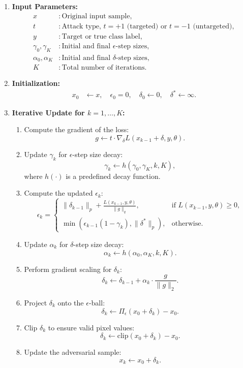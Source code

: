 \begin{enumerate}
    \item \textbf{Input Parameters:}  
    \begin{align*}
    x &: \text{Original input sample}, \\
    t &: \text{Attack type, } t = +1 \text{ (targeted) or } t = -1 \text{ (untargeted)}, \\
    y &: \text{Target or true class label}, \\
    \gamma_0, \gamma_K &: \text{Initial and final $\epsilon$-step sizes}, \\
    \alpha_0, \alpha_K &: \text{Initial and final $\delta$-step sizes}, \\
    K &: \text{Total number of iterations}.
    \end{align*}

    \item \textbf{Initialization:}  
    \begin{align*}
    x_0 &\leftarrow x, \quad \epsilon_0 = 0, \quad \delta_0 \leftarrow 0, \quad \delta^* \leftarrow \infty.
    \end{align*}

    \item \textbf{Iterative Update for $k = 1, \ldots, K$:}  
    \begin{enumerate}
        \item Compute the gradient of the loss:
        \[
        g \leftarrow t \cdot \nabla_{\delta} L(x_{k-1} + \delta, y, \theta).
        \]
        \item Update $\gamma_k$ for $\epsilon$-step size decay:
        \[
        \gamma_k \leftarrow h(\gamma_0, \gamma_K, k, K),
        \]
        where $h(\cdot)$ is a predefined decay function.
        \item Compute the updated $\epsilon_k$:
        \[
        \epsilon_k = 
        \begin{cases} 
        \|\delta_{k-1}\|_p + \frac{L(x_{k-1}, y, \theta)}{\|g\|_q}, & \text{if } L(x_{k-1}, y, \theta) \geq 0, \\
        \min(\epsilon_{k-1}(1 - \gamma_k), \|\delta^*\|_p), & \text{otherwise.}
        \end{cases}
        \]
        \item Update $\alpha_k$ for $\delta$-step size decay:
        \[
        \alpha_k \leftarrow h(\alpha_0, \alpha_K, k, K).
        \]
        \item Perform gradient scaling for $\delta_k$:
        \[
        \delta_k \leftarrow \delta_{k-1} + \alpha_k \cdot \frac{g}{\|g\|_2}.
        \]
        \item Project $\delta_k$ onto the $\epsilon$-ball:
        \[
        \delta_k \leftarrow \Pi_\epsilon(x_0 + \delta_k) - x_0.
        \]
        \item Clip $\delta_k$ to ensure valid pixel values:
        \[
        \delta_k \leftarrow \text{clip}(x_0 + \delta_k) - x_0.
        \]
        \item Update the adversarial sample:
        \[
        x_k \leftarrow x_0 + \delta_k.
        \]
    \end{enumerate}


\end{enumerate}
